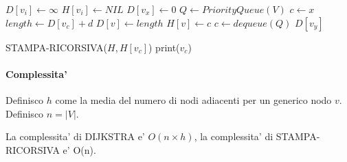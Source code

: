 \begin{algorithm}
    \begin{algorithmic}
                \State $D[v_i] \gets \infty$
                \State $H[v_i] \gets NIL$
            \EndFor
            \State $D[v_x] \gets 0$
            \State $Q \gets PriorityQueue(V)$
            \State $c \gets x$
                    \State $length \gets D[v_c] + d$
                        \State $D[v] \gets length$
                        \State $H[v] \gets c$
                    \EndIf
                \EndFor
                \State $c \gets dequeue(Q)$
            \EndWhile
            \State \Return $D[v_y]$
        \EndProcedure
    \end{algorithmic}
\end{algorithm}

\begin{algorithm}
    \begin{algorithmic}
                STAMPA-RICORSIVA($H, H[v_c]$)
            \EndIf
            print($v_c$)
        \EndProcedure
    \end{algorithmic}
\end{algorithm}

\paragraph{Complessita'}

Definisco $h$ come la media del numero di nodi adiacenti per un generico nodo $v$.
Definisco $n = |V|$.

La complessita' di DIJKSTRA e' $O(n \times h)$, la complessita' di STAMPA-RICORSIVA e' O(n).
